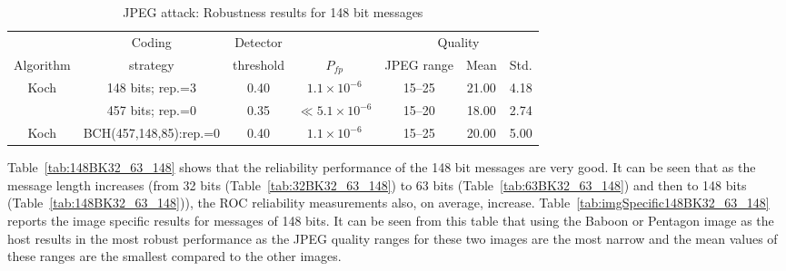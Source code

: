 \documentclass[12pt]{report}
\begin{document}
\begin{table}[!ht]
\tiny
        \begin{center}
                \begin{tabular}{|c|c|c|c|c|c|c|} \hline
				&Coding		 & Detector	&		& \multicolumn{3}{c|}{Quality}		\\ \cline{5-7}
                Algorithm       & strategy       & threshold    & $P_{fp}$      & JPEG range 			& Mean &Std. \\\hline\hline
                Koch 	& 148 bits; rep.=3      & 0.40                             & $1.1\times 10^{-6}$   & 15--25       & 21.00    & 4.18    \\ \cline{2-7}
                	& 457 bits; rep.=0      & 0.35                             & $\ll5.1\times 10^{-6}$& 15--20       & 18.00    & 2.74    \\ \hline\hline

                Koch & BCH(457,148,85):rep.=0& 0.40     & $1.1\times 10^{-6}$   & 15--25        & 20.00    & 5.00    \\ \hline
        \end{tabular}
        \caption{JPEG attack: Robustness results for 148 bit messages}
        \label{tab:GaussRobRes148DMLBK32_63_148}
        \end{center}
\end{table}
\normalsize


Table~\ref{tab:148BK32_63_148} shows that the reliability performance of the 148 bit messages are very good. It can be seen that 
as the message length increases (from 32 bits (Table~\ref{tab:32BK32_63_148}) to 63 bits (Table~\ref{tab:63BK32_63_148}) and then to 
148 bits (Table~\ref{tab:148BK32_63_148})), 
the ROC reliability measurements also, on average, increase.
Table~\ref{tab:imgSpecific148BK32_63_148} reports the image specific results for messages of 148 bits.
It can be seen from this table that using the Baboon or Pentagon image
as the host results in the most robust performance as the JPEG quality ranges for these two images are the most narrow
and the mean values of these ranges are the smallest compared to the other images.
 
\end{document}
